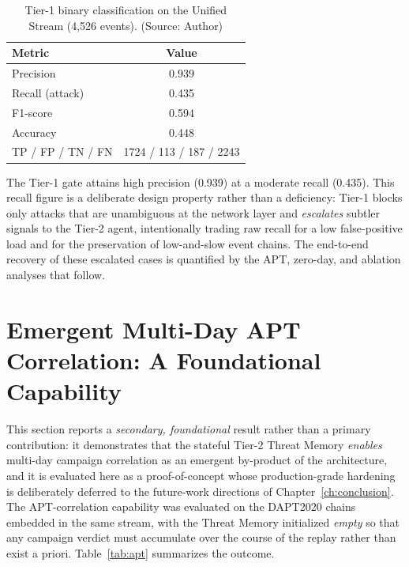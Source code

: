 \begin{table}[!htbp]
    \centering
    \caption{Tier-1 binary classification on the Unified Stream (4{,}526 events). (Source: Author)}
    \label{tab:classification}
    \begin{tabular}{|l|c|}
        \hline
        \textbf{Metric} & \textbf{Value} \\
        \hline
        Precision & 0.939 \\
        \hline
        Recall (attack) & 0.435 \\
        \hline
        F1-score & 0.594 \\
        \hline
        Accuracy & 0.448 \\
        \hline
        TP / FP / TN / FN & 1724 / 113 / 187 / 2243 \\
        \hline
    \end{tabular}
\end{table}

The Tier-1 gate attains high precision (0.939) at a moderate recall (0.435). This recall figure is a deliberate design property rather than a deficiency: Tier-1 blocks only attacks that are unambiguous at the network layer and \emph{escalates} subtler signals to the Tier-2 agent, intentionally trading raw recall for a low false-positive load and for the preservation of low-and-slow event chains. The end-to-end recovery of these escalated cases is quantified by the APT, zero-day, and ablation analyses that follow.

\section{Emergent Multi-Day APT Correlation: A Foundational Capability}
This section reports a \emph{secondary, foundational} result rather than a primary contribution: it demonstrates that the stateful Tier-2 Threat Memory \emph{enables} multi-day campaign correlation as an emergent by-product of the architecture, and it is evaluated here as a proof-of-concept whose production-grade hardening is deliberately deferred to the future-work directions of Chapter~\ref{ch:conclusion}. The APT-correlation capability was evaluated on the DAPT2020 chains embedded in the same stream, with the Threat Memory initialized \emph{empty} so that any campaign verdict must accumulate over the course of the replay rather than exist a priori. Table~\ref{tab:apt} summarizes the outcome.

